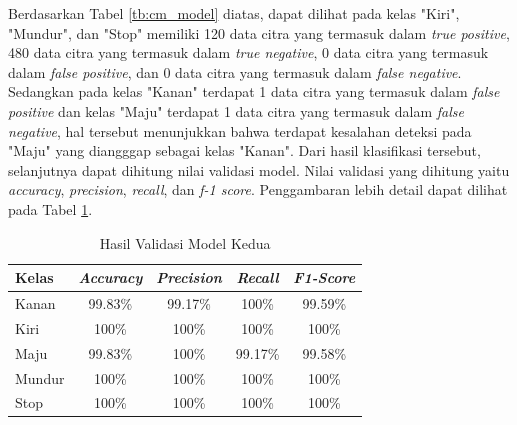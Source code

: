 Berdasarkan Tabel \ref{tb:cm_model} diatas, dapat dilihat pada kelas "Kiri", "Mundur", dan "Stop" memiliki 120 data citra yang termasuk dalam \emph{true positive}, 480 data citra yang termasuk dalam \emph{true negative}, 0 data citra yang termasuk dalam \emph{false positive}, dan 0 data citra yang termasuk dalam \emph{false negative}. Sedangkan pada kelas "Kanan" terdapat 1 data citra yang termasuk dalam \emph{false positive} dan kelas "Maju" terdapat 1 data citra yang termasuk dalam \emph{false negative}, hal tersebut menunjukkan bahwa terdapat kesalahan deteksi pada "Maju" yang diangggap sebagai kelas "Kanan". Dari hasil klasifikasi tersebut, selanjutnya dapat dihitung nilai validasi model. Nilai validasi yang dihitung yaitu \emph{accuracy}, \emph{precision}, \emph{recall}, dan \emph{f-1 score}. Penggambaran lebih detail dapat dilihat pada Tabel \ref{tb:vs_model}. 

\begin{longtable}{|l|c|c|c|c|}
  \caption{Hasil Validasi Model Kedua}
  \label{tb:vs_model} \\
  \hline
  \rowcolor[HTML]{C0C0C0} 
  \textbf{Kelas} & \textbf{\emph{Accuracy}} & \textbf{\emph{Precision}} & \textbf{\emph{Recall}} & \textbf{\emph{F1-Score}} \\ \hline
  Kanan    & 99.83\%            & 99.17\%             & 100\%           & 99.59\%            \\ \hline
  Kiri     & 100\%          & 100\%           & 100\%           & 100\%           \\ \hline
  Maju      & 99.83\%          & 100\%           & 99.17\%          & 99.58\%          \\ \hline
  Mundur     & 100\%            & 100\%             & 100\%           & 100\%            \\ \hline
  Stop  & 100\%            & 100\%             & 100\%           & 100\%            \\ \hline
\end{longtable}


